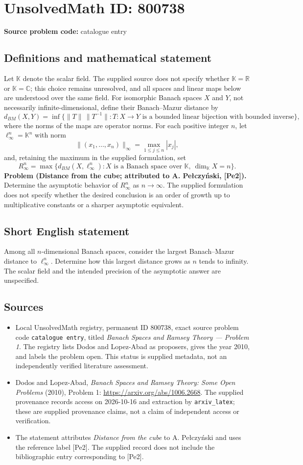 \documentclass[11pt]{article}
\newcommand{\R}{\mathbb{R}}
\newcommand{\C}{\mathbb{C}}
\begin{document}
\section*{UnsolvedMath ID: 800738}
\textbf{Source problem code:} catalogue entry
\subsection{Definitions and mathematical statement}
Let \(\mathbb K\) denote the scalar field. The supplied source does not specify whether \(\mathbb K=\R\) or \(\mathbb K=\C\); this choice remains unresolved, and all spaces and linear maps below are understood over the same field. For isomorphic Banach spaces \(X\) and \(Y\), not necessarily infinite-dimensional, define their Banach--Mazur distance by
\[
 d_{BM}(X,Y)=\inf\bigl\{\|T\|\,\|T^{-1}\|:T:X\to Y\text{ is a bounded linear bijection with bounded inverse}\bigr\},
\]
where the norms of the maps are operator norms. For each positive integer \(n\), let \(\ell_\infty^n=\mathbb K^n\) with norm
\[
 \|(x_1,\ldots,x_n)\|_\infty=\max_{1\leq j\leq n}|x_j|,
\]
and, retaining the maximum in the supplied formulation, set
\[
 R_\infty^n=\max\bigl\{d_{BM}(X,\ell_\infty^n):X\text{ is a Banach space over }\mathbb K,\ \dim_{\mathbb K}X=n\bigr\}.
\]
\textbf{Problem (Distance from the cube; attributed to A. Pe{\l}czy\'{n}ski, [Pe2]).} Determine the asymptotic behavior of \(R_\infty^n\) as \(n\to\infty\). The supplied formulation does not specify whether the desired conclusion is an order of growth up to multiplicative constants or a sharper asymptotic equivalent.
\subsection{Short English statement}
Among all \(n\)-dimensional Banach spaces, consider the largest Banach--Mazur distance to \(\ell_\infty^n\). Determine how this largest distance grows as \(n\) tends to infinity. The scalar field and the intended precision of the asymptotic answer are unspecified.
\subsection{Sources}
\begin{itemize}
\item Local UnsolvedMath registry, permanent ID \(800738\), exact source problem code \texttt{catalogue entry}, titled \emph{Banach Spaces and Ramsey Theory --- Problem 1}. The registry lists Dodos and Lopez-Abad as proposers, gives the year 2010, and labels the problem open. This status is supplied metadata, not an independently verified literature assessment.
\item Dodos and Lopez-Abad, \emph{Banach Spaces and Ramsey Theory: Some Open Problems} (2010), Problem 1: \url{https://arxiv.org/abs/1006.2668}. The supplied provenance records access on 2026-10-16 and extraction by \texttt{arxiv\_latex}; these are supplied provenance claims, not a claim of independent access or verification.
\item The statement attributes \emph{Distance from the cube} to A. Pe{\l}czy\'{n}ski and uses the reference label [Pe2]. The supplied record does not include the bibliographic entry corresponding to [Pe2].
\end{itemize}
\end{document}
